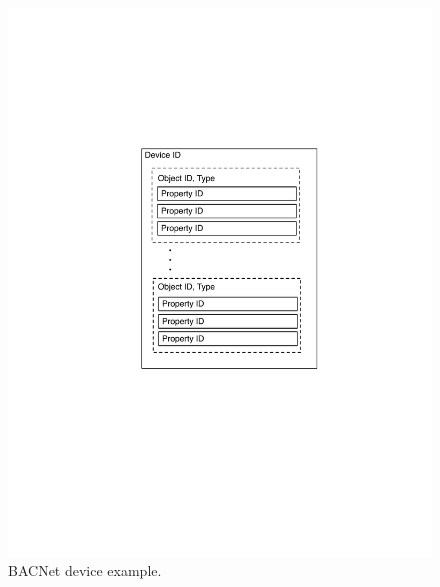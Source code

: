 \begin{figure}[t!] %
\centering
\includegraphics[width=0.25\columnwidth]{figs/bacnet_device}
\caption{BACNet device example.}
\label{fig:bacnet_device}
\end{figure}